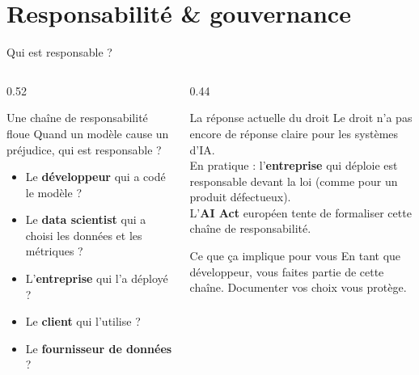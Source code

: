 \documentclass[aspectratio=169, 10pt]{beamer}
\begin{document}
\section{Responsabilité \& gouvernance}

\begin{frame}{Qui est responsable ?}
  \begin{columns}[T]
    \begin{column}{0.52\textwidth}
      \begin{alertblock}{Une chaîne de responsabilité floue}
        Quand un modèle cause un préjudice,
        qui est responsable ?
        \begin{itemize}
          \item Le \textbf{développeur} qui a codé le modèle ?
          \item Le \textbf{data scientist} qui a choisi
                les données et les métriques ?
          \item L'\textbf{entreprise} qui l'a déployé ?
          \item Le \textbf{client} qui l'utilise ?
          \item Le \textbf{fournisseur de données} ?
        \end{itemize}
      \end{alertblock}
    \end{column}
    \begin{column}{0.44\textwidth}
      \begin{block}{La réponse actuelle du droit}
        Le droit n'a pas encore de réponse claire
        pour les systèmes d'IA.\\[4pt]
        En pratique : l'\textbf{entreprise} qui déploie
        est responsable devant la loi
        (comme pour un produit défectueux).\\[4pt]
        L'\textbf{AI Act} européen tente de formaliser
        cette chaîne de responsabilité.
      \end{block}
      \smallskip
      \begin{exampleblock}{Ce que ça implique pour vous}
        En tant que développeur, vous faites partie
        de cette chaîne.
        Documenter vos choix vous protège.
      \end{exampleblock}
    \end{column}
  \end{columns}
\end{frame}
\end{document}
